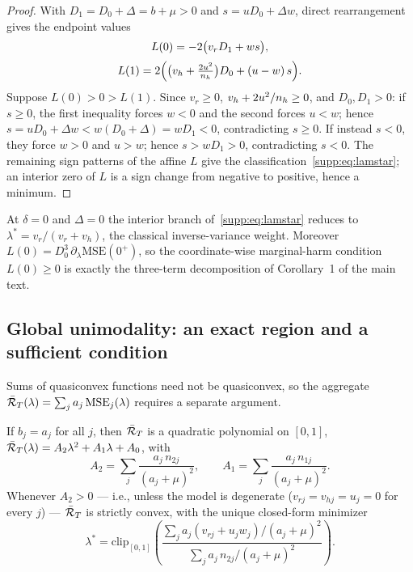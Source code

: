 \begin{proof}
With $D_1 = D_0 + \Delta = b + \mu > 0$ and $s = uD_0 + \Delta w$, direct rearrangement gives the endpoint values
\begin{equation}
\begin{gathered}
L(0) = -2\big(v_r D_1 + w s\big),
\\[2pt]
L(1) = 2\Big(\big(v_h + \tfrac{2u^2}{n_h}\big) D_0 + (u - w)\, s\Big) .
\end{gathered}
\label{supp:eq:endpoints}
\end{equation}
Suppose $L(0) > 0 > L(1)$.
Since $v_r \ge 0$, $v_h + 2u^2/n_h \ge 0$, and $D_0, D_1 > 0$: if $s \ge 0$, the first inequality forces $w < 0$ and the second forces $u < w$; hence $s = uD_0 + \Delta w < w(D_0 + \Delta) = w D_1 < 0$, contradicting $s \ge 0$.
If instead $s < 0$, they force $w > 0$ and $u > w$; hence $s > w D_1 > 0$, contradicting $s < 0$.
The remaining sign patterns of the affine $L$ give the classification~\eqref{supp:eq:lamstar}; an interior zero of $L$ is a sign change from negative to positive, hence a minimum.
\end{proof}

\begin{remark}
At $\delta = 0$ and $\Delta = 0$ the interior branch of~\eqref{supp:eq:lamstar} reduces to $\lambda^* = v_r/(v_r + v_h)$, the classical inverse-variance weight.
Moreover $L(0) = D_0^3\, \partial_\lambda \mathrm{MSE}(0^+)$, so the coordinate-wise marginal-harm condition $L(0) \ge 0$ is exactly the three-term decomposition of Corollary~1 of the main text.
\end{remark}

\subsection{Global unimodality: an exact region and a sufficient condition}

Sums of quasiconvex functions need not be quasiconvex, so the aggregate $\bar{\mathcal{R}}_T(\lambda) = \sum_j a_j\, \mathrm{MSE}_j(\lambda)$ requires a separate argument.

\begin{theorem}\label{supp:thm:quad}
If $b_j = a_j$ for all $j$, then $\bar{\mathcal{R}}_T$ is a quadratic polynomial on $[0,1]$, $\bar{\mathcal{R}}_T(\lambda) = A_2 \lambda^2 + A_1 \lambda + A_0$, with
\begin{equation}
A_2 = \sum_j \frac{a_j\, n_{2j}}{(a_j+\mu)^2},
\qquad
A_1 = \sum_j \frac{a_j\, n_{1j}}{(a_j+\mu)^2}.
\end{equation}
Whenever $A_2 > 0$ --- i.e., unless the model is degenerate ($v_{rj} = v_{hj} = u_j = 0$ for every $j$) --- $\bar{\mathcal{R}}_T$ is strictly convex, with the unique closed-form minimizer
\begin{equation}
\lambda^* = \mathrm{clip}_{[0,1]}\!\left( \frac{\sum_j a_j (v_{rj} + u_j w_j)/(a_j+\mu)^2}{\sum_j a_j\, n_{2j}/(a_j+\mu)^2} \right) .
\label{supp:eq:lamstarquad}
\end{equation}
\end{theorem}

